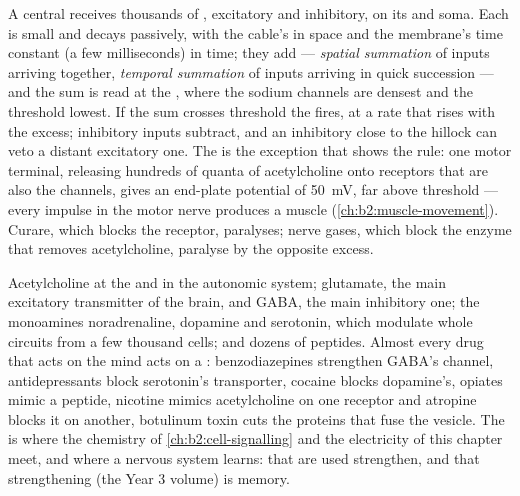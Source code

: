 \begin{proposition}\label{prop:b2:neurons-synapses:integration}
A central  receives thousands of , excitatory and
inhibitory, on its  and soma. Each 
is small and decays passively, with the cable's  in
space and the membrane's time constant (a few milliseconds) in
time; they add --- \emph{spatial summation} of inputs arriving
together, \emph{temporal summation} of inputs arriving in quick
succession --- and the sum is read at the \emph{}, where
the sodium channels are densest and the threshold lowest. If the
sum crosses threshold the  fires, at a rate that rises with the
excess; inhibitory inputs subtract, and an inhibitory  close
to the hillock can veto a distant excitatory one. The
 is the exception that shows the rule: one
motor terminal, releasing hundreds of quanta of acetylcholine onto
receptors that are also the channels, gives an end-plate potential
of \qty{50}{mV}, far above threshold --- every impulse in the motor
nerve produces a muscle 
(\cref{ch:b2:muscle-movement}). Curare, which blocks the receptor,
paralyses; nerve gases, which block the enzyme that removes
acetylcholine, paralyse by the opposite excess.
\end{proposition}

\begin{example}\label{ex:b2:neurons-synapses:transmitters}
Acetylcholine at the  and in the autonomic
system; glutamate, the main excitatory transmitter of the brain,
and GABA, the main inhibitory one; the monoamines noradrenaline,
dopamine and serotonin, which modulate whole circuits from a few
thousand cells; and dozens of peptides. Almost every drug that acts
on the mind acts on a : benzodiazepines strengthen GABA's
channel, antidepressants block serotonin's transporter, cocaine
blocks dopamine's, opiates mimic a peptide, nicotine mimics
acetylcholine on one receptor and atropine blocks it on another,
botulinum toxin cuts the proteins that fuse the vesicle. The 
is where the chemistry of \cref{ch:b2:cell-signalling} and the
electricity of this chapter meet, and where a nervous system learns:
 that are used strengthen, and that strengthening (the
Year 3 volume) is memory.
\end{example}

